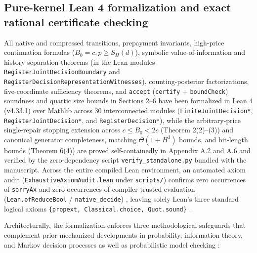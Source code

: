 \documentclass[11pt,letterpaper]{article}
\begin{document}
\subsection{Pure-kernel Lean 4 formalization and exact rational
certificate
checking}\label{pure-kernel-lean-4-formalization-and-exact-rational-certificate-checking}

All native and compressed transitions, prepayment invariants, high-price
continuation formulas (\(B_0 = c, p \ge S_H(d)\)), symbolic
value-of-information and history-separation theorems (in the Lean
modules \texttt{RegisterJointDecisionBoundary} and
\texttt{RegisterDecisionRepresentationWitnesses}), counting-posterior
factorizations, five-coordinate sufficiency theorems, and
\texttt{accept} (\texttt{certify} + \texttt{boundCheck}) soundness and
quartic size bounds in Sections 2--6 have been formalized in Lean 4
(v4.33.1) over Mathlib \citep{mouraUllrich2021, mathlib2020} across 30
interconnected modules (\texttt{FiniteJointDecision*},
\texttt{RegisterJointDecision*}, and \texttt{RegisterDecision*}), while
the arbitrary-price single-repair stopping extension across
\(c \le B_0 < 2c\) (Theorem 2(2)--(3)) and canonical generator
completeness, matching \(\Theta(1 + H^3)\) bounds, and bit-length bounds
(Theorem 6(4)) are proved self-containedly in Appendix A.2 and A.6 and
verified by the zero-dependency script \texttt{verify\_standalone.py}
bundled with the manuscript. Across the entire compiled Lean
environment, an automated axiom audit
(\texttt{ExhaustiveAxiomAudit.lean} under \texttt{scripts/}) confirms
zero occurrences of \texttt{sorryAx} and zero occurrences of
compiler-trusted evaluation (\texttt{Lean.ofReduceBool} /
\texttt{native\_decide}) \citep{boespflug2011}, leaving solely Lean's
three standard logical axioms
\texttt{\{propext,\ Classical.choice,\ Quot.sound\}}
\citep{carneiro2019}.

Architecturally, the formalization enforces three methodological
safeguards that complement prior mechanized developments in probability,
information theory, and Markov decision processes
\citep{nipkowPaulsonWenzel2002, bertotCasteran2004, affeldt2014, eberl2015, hoelzl2017, vajjha2021, schaeffelerAbdulaziz2023}
as well as probabilistic model checking
\citep{baierKatoen2008, kwiatkowska2011}:
\end{document}
